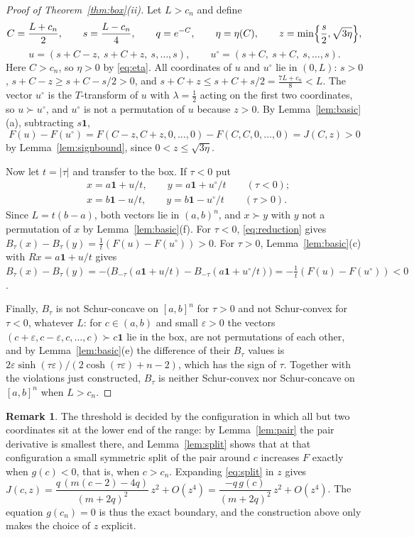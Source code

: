 \documentclass[11pt,a4paper]{article}
\theoremstyle{plain}
\theoremstyle{definition}
\newtheorem{remark}[theorem]{Remark}
\newcommand{\one}{\mathbf{1}}
\newcommand{\maj}{\succ}
\begin{document}
\begin{proof}[Proof of Theorem~\ref{thm:box}(ii)]
Let $L>c_n$ and define
\begin{equation}\label{eq:box-construction}
C=\frac{L+c_n}{2},\qquad s=\frac{L-c_n}{4},\qquad q=e^{-C},\qquad \eta=\eta(C),\qquad z=\min\Bigl\{\frac{s}{2},\sqrt{3\eta}\Bigr\},
\end{equation}
\[
u=(s+C-z,\ s+C+z,\ s,\dots,s),\qquad u^\circ=(s+C,\ s+C,\ s,\dots,s).
\]
Here $C>c_n$, so $\eta>0$ by \eqref{eq:eta}. All coordinates of $u$ and $u^\circ$ lie in $(0,L)$: $s>0$, $s+C-z\ge s+C-s/2>0$, and $s+C+z\le s+C+s/2=\frac{7L+c_n}{8}<L$. The vector $u^\circ$ is the $T$-transform of $u$ with $\lambda=\frac12$ acting on the first two coordinates, so $u\maj u^\circ$, and $u^\circ$ is not a permutation of $u$ because $z>0$. By Lemma~\ref{lem:basic}(a), subtracting $s\one$,
\[
F(u)-F(u^\circ)=F(C-z,C+z,0,\dots,0)-F(C,C,0,\dots,0)=J(C,z)>0
\]
by Lemma~\ref{lem:signbound}, since $0<z\le\sqrt{3\eta}$.

Now let $t=|\tau|$ and transfer to the box. If $\tau<0$ put
\begin{equation}\label{eq:box-witness}
\begin{aligned}
&x=a\one+u/t,\qquad y=a\one+u^\circ/t\qquad(\tau<0);\\
&x=b\one-u/t,\qquad y=b\one-u^\circ/t\qquad(\tau>0).
\end{aligned}
\end{equation}
Since $L=t(b-a)$, both vectors lie in $(a,b)^n$, and $x\maj y$ with $y$ not a permutation of $x$ by Lemma~\ref{lem:basic}(f). For $\tau<0$, \eqref{eq:reduction} gives $B_\tau(x)-B_\tau(y)=\frac1t(F(u)-F(u^\circ))>0$. For $\tau>0$, Lemma~\ref{lem:basic}(c) with $R x=a\one+u/t$ gives $B_\tau(x)-B_\tau(y)=-\bigl(B_{-\tau}(a\one+u/t)-B_{-\tau}(a\one+u^\circ/t)\bigr)=-\frac1t(F(u)-F(u^\circ))<0$.

Finally, $B_\tau$ is not Schur-concave on $[a,b]^n$ for $\tau>0$ and not Schur-convex for $\tau<0$, whatever $L$: for $c\in(a,b)$ and small $\varepsilon>0$ the vectors $(c+\varepsilon,c-\varepsilon,c,\dots,c)\maj c\one$ lie in the box, are not permutations of each other, and by Lemma~\ref{lem:basic}(e) the difference of their $B_\tau$ values is $2\varepsilon\sinh(\tau\varepsilon)/(2\cosh(\tau\varepsilon)+n-2)$, which has the sign of $\tau$. Together with the violations just constructed, $B_\tau$ is neither Schur-convex nor Schur-concave on $[a,b]^n$ when $L>c_n$.
\end{proof}

\begin{remark}\label{rem:extremal}
The threshold is decided by the configuration in which all but two coordinates sit at the lower end of the range: by Lemma~\ref{lem:pair} the pair derivative is smallest there, and Lemma~\ref{lem:split} shows that at that configuration a small symmetric split of the pair around $c$ increases $F$ exactly when $g(c)<0$, that is, when $c>c_n$. Expanding \eqref{eq:split} in $z$ gives $J(c,z)=\dfrac{q\,(m(c-2)-4q)}{(m+2q)^2}\,z^2+O(z^4)=\dfrac{-q\,g(c)}{(m+2q)^2}\,z^2+O(z^4)$. The equation $g(c_n)=0$ is thus the exact boundary, and the construction above only makes the choice of $z$ explicit.
\end{remark}
\end{document}
